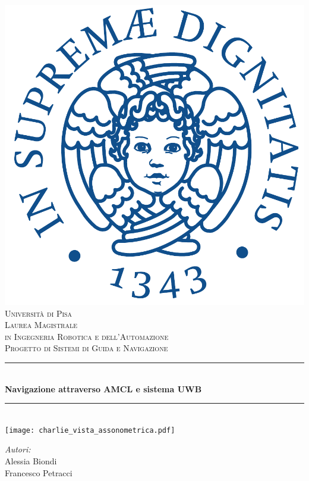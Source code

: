 \begin{titlepage}
	\centering
	\vspace*{0.0 cm}
	\includegraphics[height=.2\textheight]{figs/cherubino_pant541.pdf}\\[0.5 cm]			%
	\textsc{\Large Universit\`a di Pisa }\\[0.5 cm]							%
	\textsc{\large Laurea Magistrale \\ 
		\vspace{2mm} in Ingegneria Robotica e dell'Automazione}\\[0.5 cm]
	\textsc{Progetto di Sistemi di Guida e Navigazione}\\[0.25 cm]	
	
	\rule{\linewidth}{0.2 mm} \\[0.4 cm]
	{ \Large{\textbf{Navigazione attraverso AMCL e sistema UWB}}}\\
	\rule{\linewidth}{0.2 mm} \\[0.5 cm]
	
	\texttt{[image: charlie\_vista\_assonometrica.pdf]}\\	
	\vspace{1 cm}
	
	
	\begin{minipage}{0.48\textwidth}
		\begin{flushleft}
			\textit{Autori:}\\
			Alessia Biondi\\
			Francesco Petracci
			

\end{flushleft}
\end{minipage}
\end{titlepage}
